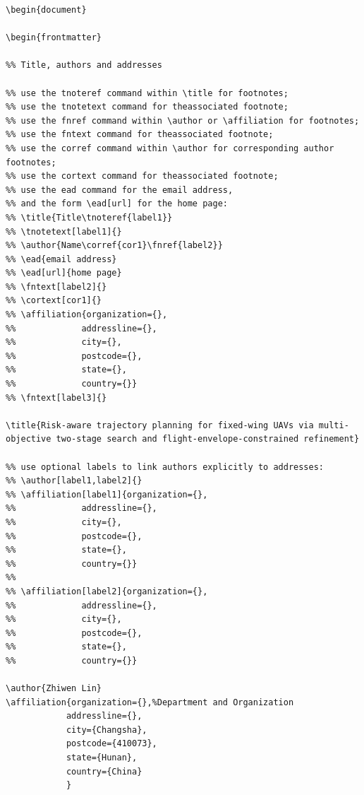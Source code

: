 \documentclass[12pt]{article}
\begin{document}
\begin{verbatim}
\begin{document}

\begin{frontmatter}

%% Title, authors and addresses

%% use the tnoteref command within \title for footnotes;
%% use the tnotetext command for theassociated footnote;
%% use the fnref command within \author or \affiliation for footnotes;
%% use the fntext command for theassociated footnote;
%% use the corref command within \author for corresponding author footnotes;
%% use the cortext command for theassociated footnote;
%% use the ead command for the email address,
%% and the form \ead[url] for the home page:
%% \title{Title\tnoteref{label1}}
%% \tnotetext[label1]{}
%% \author{Name\corref{cor1}\fnref{label2}}
%% \ead{email address}
%% \ead[url]{home page}
%% \fntext[label2]{}
%% \cortext[cor1]{}
%% \affiliation{organization={},
%%             addressline={},
%%             city={},
%%             postcode={},
%%             state={},
%%             country={}}
%% \fntext[label3]{}

\title{Risk-aware trajectory planning for fixed-wing UAVs via multi-objective two-stage search and flight-envelope-constrained refinement}

%% use optional labels to link authors explicitly to addresses:
%% \author[label1,label2]{}
%% \affiliation[label1]{organization={},
%%             addressline={},
%%             city={},
%%             postcode={},
%%             state={},
%%             country={}}
%%
%% \affiliation[label2]{organization={},
%%             addressline={},
%%             city={},
%%             postcode={},
%%             state={},
%%             country={}}

\author{Zhiwen Lin}
\affiliation{organization={},%Department and Organization
            addressline={},
            city={Changsha},
            postcode={410073},
            state={Hunan},
            country={China}
            }


\end{verbatim}
\end{document}

